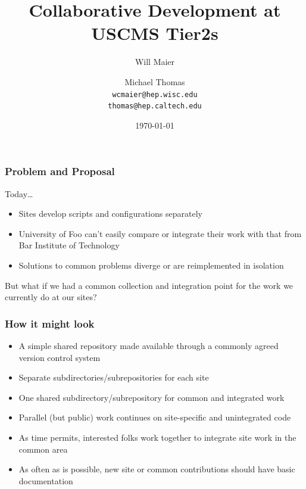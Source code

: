 \documentclass{beamer}
\title[Collaborative Development]{Collaborative Development at USCMS Tier2s}
\author[Maier, Thomas]{
    Will Maier\inst{1} \and Michael Thomas\inst{2}\\ 
    {\tt wcmaier@hep.wisc.edu}\\
    {\tt thomas@hep.caltech.edu}}
\institute[UW, CIT]{
    \inst{1}University of Wisconsin
    \and
    \inst{2}Caltech}
\date{\today}
\begin{document}
\begin{frame}
    \titlepage
\end{frame}


\begin{frame}
\frametitle{Problem and Proposal}
Today\ldots{}
\begin{itemize}
    \item Sites develop scripts and configurations separately
    \item University of Foo can't easily compare or integrate their work with that from Bar Institute of Technology
    \item Solutions to common problems diverge or are reimplemented in isolation
\end{itemize}
But what if we had a common collection and integration point for the work we currently do at our sites?
\end{frame}

\begin{frame}
\frametitle{How it might look}
\begin{itemize}
    \item A simple shared repository made available through a commonly agreed version control system
    \item Separate subdirectories/subrepositories for each site
    \item One shared subdirectory/subrepository for common and integrated work
    \item Parallel (but public) work continues on site-specific and unintegrated code
    \item As time permits, interested folks work together to integrate site work in the common area
    \item As often as is possible, new site or common contributions should have basic documentation
\end{itemize}
\end{frame}
\end{document}
